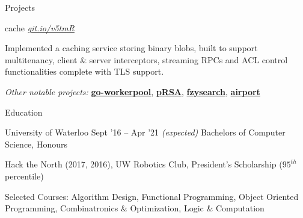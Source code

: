 \documentclass{resume} %
\begin{document}
\begin{rSection}{Projects}
  \begin{rSubsection}{cache}
	  {\em {\href{http://github.com/ridwanmsharif/cache}
		    {git.io/v5tmR}}}
	  {}

    \item Implemented a caching service storing binary blobs, built to support multitenancy,
      client \& server interceptors, streaming RPCs and ACL control functionalities complete with TLS support. 
  \end{rSubsection}
  
  \begin{rMinisection}
    \item {\em Other notable projects:}
      \href{https://github.com/ridwanmsharif/goworkerpool}{\textbf{go-workerpool}},
      \href{https://github.com/ridwanmsharif/prsa}{\textbf{pRSA}},
      \href{https://github.com/ridwanmsharif/fzysearch}{\textbf{fzysearch}},
      \href{https://github.com/ridwanmsharif/airport}{\textbf{airport}}
  \end{rMinisection}
\end{rSection}


\begin{rSection}{Education}
  \begin{rSubsection}{University of Waterloo}
		     {Sept '16 -- Apr '21 \em (expected)}
		     {Bachelors of Computer Science, Honours}
		     {}
    \item Hack the North (2017, 2016), UW Robotics Club, President's Scholarship
      ($95^{th}$ percentile)
    \item Selected Courses: Algorithm Design, Functional Programming, Object
      Oriented Programming, Combinatronics \& Optimization, Logic \&
      Computation
  \end{rSubsection}
\end{rSection} 
\end{document}
